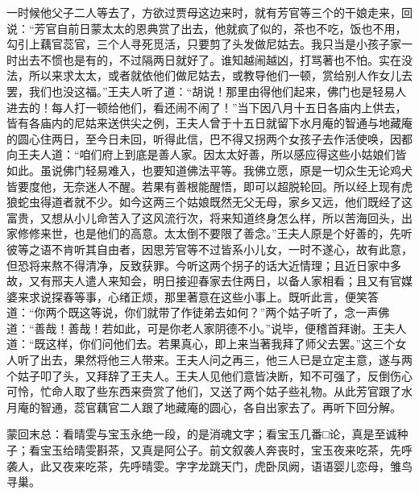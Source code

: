 \begin{parag}
    一时候他父子二人等去了，方欲过贾母这边来时，就有芳官等三个的干娘走来，回说：“芳官自前日蒙太太的恩典赏了出去，他就疯了似的，茶也不吃，饭也不用，勾引上藕官蕊官，三个人寻死觅活，只要剪了头发做尼姑去。我只当是小孩子家一时出去不惯也是有的，不过隔两日就好了。谁知越闹越凶，打骂著也不怕。实在没法，所以来求太太，或者就依他们做尼姑去，或教导他们一顿，赏给别人作女儿去罢，我们也没这福。”王夫人听了道：“胡说！那里由得他们起来，佛门也是轻易人进去的！每人打一顿给他们，看还闹不闹了！”当下因八月十五日各庙内上供去，皆有各庙内的尼姑来送供尖之例，王夫人曾于十五日就留下水月庵的智通与地藏庵的圆心住两日，至今日未回，听得此信，巴不得又拐两个女孩子去作活使唤，因都向王夫人道：“咱们府上到底是善人家。因太太好善，所以感应得这些小姑娘们皆如此。虽说佛门轻易难入，也要知道佛法平等。我佛立愿，原是一切众生无论鸡犬皆要度他，无奈迷人不醒。若果有善根能醒悟，即可以超脱轮回。所以经上现有虎狼蛇虫得道者就不少。如今这两三个姑娘既然无父无母，家乡又远，他们既经了这富贵，又想从小儿命苦入了这风流行次，将来知道终身怎么样，所以苦海回头，出家修修来世，也是他们的高意。太太倒不要限了善念。”王夫人原是个好善的，先听彼等之语不肯听其自由者，因思芳官等不过皆系小儿女，一时不遂心，故有此意，但恐将来熬不得清净，反致获罪。今听这两个拐子的话大近情理；且近日家中多故，又有邢夫人遣人来知会，明日接迎春家去住两日，以备人家相看；且又有官媒婆来求说探春等事，心绪正烦，那里著意在这些小事上。既听此言，便笑答道：“你两个既这等说，你们就带了作徒弟去如何？”两个姑子听了，念一声佛道：“善哉！善哉！若如此，可是你老人家阴德不小。”说毕，便稽首拜谢。王夫人道：“既这样，你们问他们去。若果真心，即上来当著我拜了师父去罢。”这三个女人听了出去，果然将他三人带来。王夫人问之再三，他三人已是立定主意，遂与两个姑子叩了头，又拜辞了王夫人。王夫人见他们意皆决断，知不可强了，反倒伤心可怜，忙命人取了些东西来赍赏了他们，又送了两个姑子些礼物。从此芳官跟了水月庵的智通，蕊官藕官二人跟了地藏庵的圆心，各自出家去了。再听下回分解。
\end{parag}


\begin{parag}
    \begin{note}蒙回末总：看晴雯与宝玉永绝一段，的是消魂文字；看宝玉几番□论，真是至诚种子；看宝玉给晴雯斟茶，又真是阿公子。前文叙袭人奔丧时，宝玉夜来吃茶，先呼袭人，此又夜来吃茶，先呼晴雯。字字龙跳天门，虎卧凤阙，语语婴儿恋母，雏鸟寻巢。\end{note}
\end{parag}
